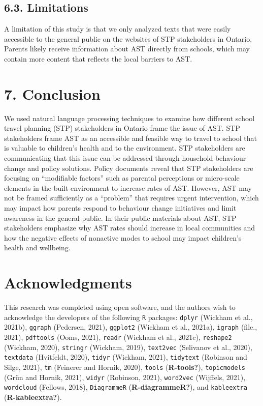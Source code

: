 \documentclass[]{elsarticle} %
\begin{document}
\hypertarget{limitations}{%
\subsection{6.3. Limitations}\label{limitations}}

A limitation of this study is that we only analyzed texts that were
easily accessible to the general public on the websites of STP
stakeholders in Ontario. Parents likely receive information about AST
directly from schools, which may contain more content that reflects the
local barriers to AST.

\hypertarget{conclusion}{%
\section{7. Conclusion}\label{conclusion}}

We used natural language processing techniques to examine how different
school travel planning (STP) stakeholders in Ontario frame the issue of
AST. STP stakeholders frame AST as an accessible and feasible way to
travel to school that is valuable to children's health and to the
environment. STP stakeholders are communicating that this issue can be
addressed through household behaviour change and policy solutions.
Policy documents reveal that STP stakeholders are focusing on
``modifiable factors'' such as parental perceptions or micro-scale
elements in the built environment to increase rates of AST. However, AST
may not be framed sufficiently as a ``problem'' that requires urgent
intervention, which may impact how parents respond to behaviour change
initiatives and limit awareness in the general public. In their public
materials about AST, STP stakeholders emphasize why AST rates should
increase in local communities and how the negative effects of nonactive
modes to school may impact children's health and wellbeing.

\hypertarget{acknowledgments}{%
\section{Acknowledgments}\label{acknowledgments}}

This research was completed using open software, and the authors wish to
acknowledge the developers of the following \texttt{R} packages:
\texttt{dplyr} (Wickham et al., 2021b), \texttt{ggraph} (Pedersen,
2021), \texttt{ggplot2} (Wickham et al., 2021a), \texttt{igraph} (file.,
2021), \texttt{pdftools} (Ooms, 2021), \texttt{readr} (Wickham et al.,
2021c), \texttt{reshape2} (Wickham, 2020), \texttt{stringr} (Wickham,
2019), \texttt{text2vec} (Selivanov et al., 2020), \texttt{textdata}
(Hvitfeldt, 2020), \texttt{tidyr} (Wickham, 2021), \texttt{tidytext}
(Robinson and Silge, 2021), \texttt{tm} (Feinerer and Hornik, 2020),
\texttt{tools} (\textbf{R-tools?}), \texttt{topicmodels} (Grün and
Hornik, 2021), \texttt{widyr} (Robinson, 2021), \texttt{word2vec}
(Wijffels, 2021), \texttt{wordcloud} (Fellows, 2018),
\texttt{DiagrammeR} (\textbf{R-diagrammeR?}), and \texttt{kableextra}
(\textbf{R-kableextra?}).
\end{document}
